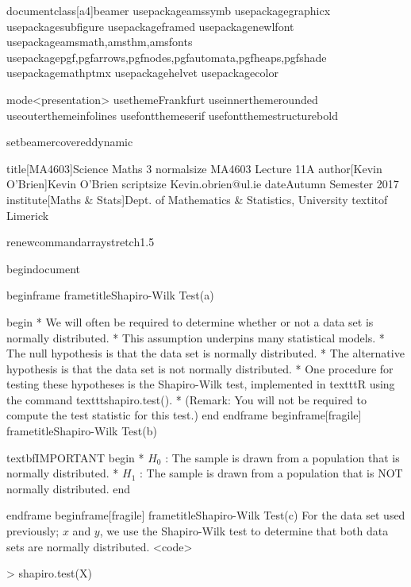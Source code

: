 documentclass[a4]{beamer}
usepackage{amssymb}
usepackage{graphicx}
usepackage{subfigure}
usepackage{framed}
usepackage{newlfont}
usepackage{amsmath,amsthm,amsfonts}
usepackage{pgf,pgfarrows,pgfnodes,pgfautomata,pgfheaps,pgfshade}
usepackage{mathptmx}  %
usepackage{helvet}   %
usepackage{color}

mode<presentation> {
 usetheme{Frankfurt} %
 useinnertheme{rounded}
 useoutertheme{infolines}
 usefonttheme{serif}
usefonttheme{structurebold}
}

setbeamercovered{dynamic}

title[MA4603]{Science Maths 3  {normalsize MA4603 Lecture 11A}}
author[Kevin O'Brien]{Kevin O'Brien  {scriptsize Kevin.obrien@ul.ie}}
date{Autumn Semester 2017}
institute[Maths & Stats]{Dept. of Mathematics & Statistics,  University textit{of} Limerick}

renewcommand{arraystretch}{1.5}

begin{document}





begin{frame}
frametitle{Shapiro-Wilk Test(a)}


begin{ }
 *           We will often be required to determine whether or not a data set is normally distributed.
 *           This assumption underpins many statistical models.
 *           The null hypothesis is that the data set is normally distributed.
 *           The alternative hypothesis is that the data set is not normally distributed.
 *           One procedure for testing these hypotheses is the Shapiro-Wilk test, implemented in texttt{R} using the command texttt{shapiro.test()}.
 *           (Remark: You will not be required to compute the test statistic for this test.)
end{ }
end{frame}
begin{frame}[fragile]
	frametitle{Shapiro-Wilk Test(b)}

textbf{IMPORTANT}
begin{ }
	 *           $H_0$ : The sample is drawn from a population that is normally distributed. 
	 *           $H_1$ : The sample is drawn from a population that is NOT normally distributed. 
end{ }
	
end{frame}
begin{frame}[fragile]
frametitle{Shapiro-Wilk Test(c)}
For the data set used previously; $x$ and $y$, we use the Shapiro-Wilk test to determine that both data sets are normally distributed.
<code>

> shapiro.test(X)

